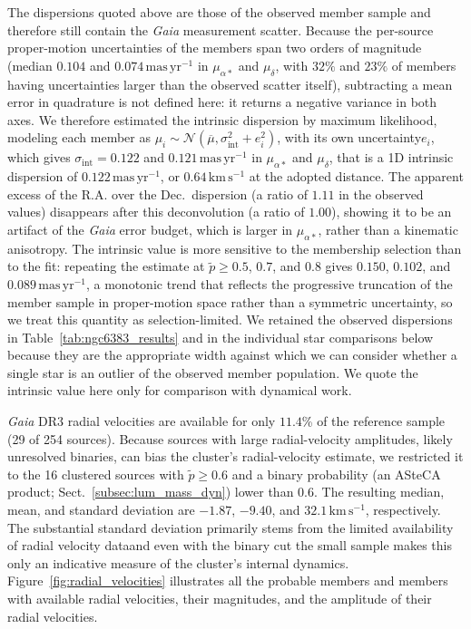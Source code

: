 \documentclass{aa}
\providecommand{\DIFaddtex}[1]{{\protect\color{red}\uwave{#1}}} %
\providecommand{\DIFaddbegin}{} %
\providecommand{\DIFaddend}{} %
\providecommand{\DIFadd}[1]{\texorpdfstring{\DIFaddtex{#1}}{#1}} %
\providecommand{\DIFaddincludegraphics}[2][]{{\color{blue}\fbox{\DIFOincludegraphics[#1]{#2}}}} %
\DeclareRobustCommand{\DIFaddbegin}{\DIFOaddbegin \let\includegraphics\DIFaddincludegraphics} %
\DeclareRobustCommand{\DIFaddend}{\DIFOaddend \let\includegraphics\DIFOincludegraphics} %
\begin{document}
The dispersions quoted above are those of the observed member sample and therefore still contain the \textit{Gaia} measurement scatter. Because the per-source proper-motion uncertainties of the members span two orders of magnitude (median $0.104$ and $0.074\,\mathrm{mas\,yr^{-1}}$ in $\mu_{\alpha*}$ and $\mu_\delta$, with $32\%$ and $23\%$ of members having uncertainties larger than the observed scatter itself), subtracting a mean error in quadrature is not defined here: it returns a negative variance in both axes. We therefore estimated the intrinsic dispersion by maximum likelihood, modeling each member as $\mu_i \sim \mathcal{N}(\overline{\mu}, \sigma_{\mathrm{int}}^2 + e_i^2)$, with its own uncertainty\DIFaddbegin \DIFadd{, }\DIFaddend $e_i$, which gives $\sigma_{\mathrm{int}} = 0.122$ and $0.121\,\mathrm{mas\,yr^{-1}}$ in $\mu_{\alpha*}$ and $\mu_\delta$, that is a 1D intrinsic dispersion of $0.122\,\mathrm{mas\,yr^{-1}}$, or $0.64\,\mathrm{km\,s^{-1}}$ at the adopted distance. The apparent excess of the R.A. over the Dec.\ dispersion (a ratio of $1.11$ in the observed values) disappears after this deconvolution (a ratio of $1.00$), showing it to be an artifact of the \textit{Gaia} error budget, which is larger in $\mu_{\alpha*}$, rather than a kinematic anisotropy. The intrinsic value is more sensitive to the membership selection than to the fit: repeating the estimate at $\tilde{p}\geq0.5$, $0.7$, and $0.8$ gives $0.150$, $0.102$, and $0.089\,\mathrm{mas\,yr^{-1}}$, a monotonic trend that reflects the progressive truncation of the member sample in proper-motion space rather than a symmetric uncertainty, so we treat this quantity as selection-limited. We retained the observed dispersions in Table~\ref{tab:ngc6383_results} and in the individual star comparisons below because they are the appropriate width against which we can consider whether a single star is an outlier of the observed member population. We quote the intrinsic value here only for comparison with dynamical work.

\textit{Gaia} DR3 radial velocities are available for only $11.4$\% of the reference sample (29 of 254 sources). Because sources with large radial-velocity amplitudes, likely unresolved binaries, can bias the cluster's radial-velocity estimate, we restricted it to the 16 clustered sources with $\tilde{p}\geq0.6$ and a binary probability (an ASteCA product; Sect.~\ref{subsec:lum_mass_dyn}) lower than $0.6$. The resulting median, mean, and standard deviation are $-1.87$, $-9.40$, and $32.1\,\mathrm{km\,s^{-1}}$, respectively. The substantial standard deviation primarily stems from the limited availability of radial velocity data\DIFaddbegin \DIFadd{, }\DIFaddend and even with the binary cut the small sample makes this only an indicative measure of the cluster's internal dynamics. Figure~\ref{fig:radial_velocities} illustrates all the probable members and members with available radial velocities, their magnitudes, and the amplitude of their radial velocities.
\end{document}
